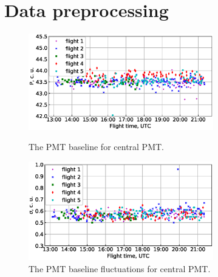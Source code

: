 \documentclass[final,5p,times,twocolumn]{elsarticle}
\begin{document}
\section{Data preprocessing\label{sect:preprocessing}}

\begin{figure}[t]
\centering
\begin{minipage}[t]{0.5\textwidth}
\includegraphics[width=19pc]{figs/pied_PMT1.eps}
\vspace{-1.0pc}
\caption{The PMT baseline for central PMT.}
\label{fig:pied}
\end{minipage}
\vfill
\vspace{1pc}
\begin{minipage}[t]{0.5\textwidth}
\includegraphics[width=19pc]{figs/piedfluct_PMT1.eps}
\vspace{-1.0pc}
\caption{The PMT baseline fluctuations for central PMT.}
\label{fig:piedfluct}
\end{minipage}
\end{figure}


\end{document}
